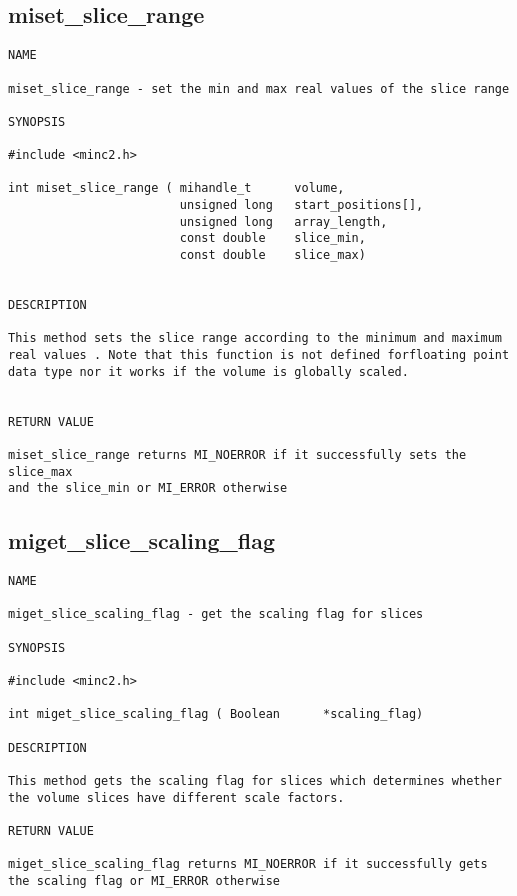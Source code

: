 \documentclass{article}
\begin{document}
\subsection{miset\_slice\_range}
\begin{verbatim}
NAME 

miset_slice_range - set the min and max real values of the slice range

SYNOPSIS

#include <minc2.h>

int miset_slice_range ( mihandle_t      volume,
                        unsigned long   start_positions[],
                        unsigned long   array_length,
                        const double    slice_min,
                        const double    slice_max)
                       
                                
DESCRIPTION

This method sets the slice range according to the minimum and maximum
real values . Note that this function is not defined forfloating point 
data type nor it works if the volume is globally scaled.


RETURN VALUE

miset_slice_range returns MI_NOERROR if it successfully sets the slice_max
and the slice_min or MI_ERROR otherwise
\end{verbatim}

\subsection{miget\_slice\_scaling\_flag}
\begin{verbatim}
NAME 

miget_slice_scaling_flag - get the scaling flag for slices

SYNOPSIS

#include <minc2.h>

int miget_slice_scaling_flag ( Boolean      *scaling_flag)
                                
DESCRIPTION

This method gets the scaling flag for slices which determines whether 
the volume slices have different scale factors. 

RETURN VALUE

miget_slice_scaling_flag returns MI_NOERROR if it successfully gets 
the scaling flag or MI_ERROR otherwise
\end{verbatim}
\end{document}
